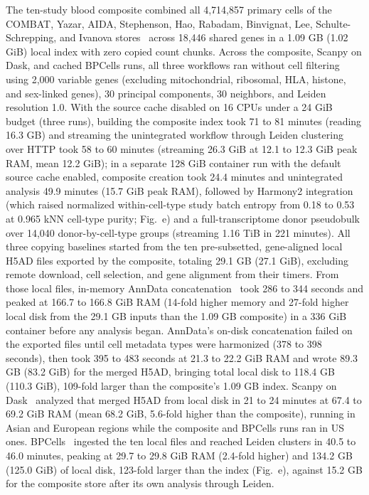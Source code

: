 \label{note:Blood composite and copying baselines}

The ten-study blood composite combined all 4,714,857 primary cells of the COMBAT, Yazar, AIDA, Stephenson, Hao, Rabadam, Binvignat, Lee, Schulte-Schrepping, and Ivanova stores~\cite{combat2022blood,yazar2022singlecell,kock2025asian,stephenson2021singlecell,hao2021,rabadam2024coordinated,binvignat2024,lee2020immunophenotyping,schulteschrepping2020severe,jin2021interactive,ivanova2023mrna} across 18,446 shared genes in a 1.09 GB (1.02 GiB) local index with zero copied count chunks. Across the composite, Scanpy on Dask, and cached BPCells runs, all three workflows ran without cell filtering using 2,000 variable genes (excluding mitochondrial, ribosomal, HLA, histone, and sex-linked genes), 30 principal components, 30 neighbors, and Leiden resolution 1.0. With the source cache disabled on 16 CPUs under a 24 GiB budget (three runs), building the composite index took 71 to 81 minutes (reading 16.3 GB) and streaming the unintegrated workflow through Leiden clustering over HTTP took 58 to 60 minutes (streaming 26.3 GiB at 12.1 to 12.3 GiB peak RAM, mean 12.2 GiB); in a separate 128 GiB container run with the default source cache enabled, composite creation took 24.4 minutes and unintegrated analysis 49.9 minutes (15.7 GiB peak RAM), followed by Harmony2 integration~\cite{patikas2026integration} (which raised normalized within-cell-type study batch entropy from 0.18 to 0.53 at 0.965 kNN cell-type purity; Fig.~e) and a full-transcriptome donor pseudobulk over 14,040 donor-by-cell-type groups (streaming 1.16 TiB in 221 minutes). All three copying baselines started from the ten pre-subsetted, gene-aligned local H5AD files exported by the composite, totaling 29.1 GB (27.1 GiB), excluding remote download, cell selection, and gene alignment from their timers. From those local files, in-memory AnnData concatenation~\cite{virshup2024} took 286 to 344 seconds and peaked at 166.7 to 166.8 GiB RAM (14-fold higher memory and 27-fold higher local disk from the 29.1 GB inputs than the 1.09 GB composite) in a 336 GiB container before any analysis began. AnnData's on-disk concatenation failed on the exported files until cell metadata types were harmonized (378 to 398 seconds), then took 395 to 483 seconds at 21.3 to 22.2 GiB RAM and wrote 89.3 GB (83.2 GiB) for the merged H5AD, bringing total local disk to 118.4 GB (110.3 GiB), 109-fold larger than the composite's 1.09 GB index. Scanpy on Dask~\cite{wolf2018,scanpydask} analyzed that merged H5AD from local disk in 21 to 24 minutes at 67.4 to 69.2 GiB RAM (mean 68.2 GiB, 5.6-fold higher than the composite), running in Asian and European regions while the composite and BPCells runs ran in US ones. BPCells~\cite{parks2025bpcells} ingested the ten local files and reached Leiden clusters in 40.5 to 46.0 minutes, peaking at 29.7 to 29.8 GiB RAM (2.4-fold higher) and 134.2 GB (125.0 GiB) of local disk, 123-fold larger than the index (Fig.~e), against 15.2 GB for the composite store after its own analysis through Leiden.

